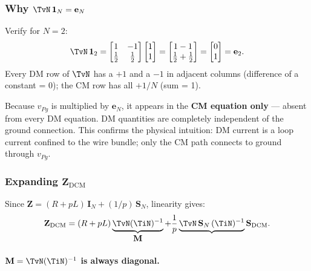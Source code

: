 \subsubsection*{Why $\TvN\,\mathbf{1}_N = \mathbf{e}_N$}

Verify for $N = 2$:
\[
\TvN\,\mathbf{1}_2
=
\begin{bmatrix}
1 & -1 \\ \tfrac{1}{2} & \tfrac{1}{2}
\end{bmatrix}
\begin{bmatrix}1 \\ 1\end{bmatrix}
=
\begin{bmatrix}1-1 \\ \tfrac{1}{2}+\tfrac{1}{2}\end{bmatrix}
=
\begin{bmatrix}0 \\ 1\end{bmatrix}
= \mathbf{e}_2.
\]
Every DM row of $\TvN$ has a $+1$ and a $-1$ in adjacent columns
(difference of a constant = 0); the CM row has all $+1/N$ (sum = 1).

\begin{statebox}
Because $v_{Pg}$ is multiplied by $\mathbf{e}_N$, it appears in the
\textbf{CM equation only} — absent from every DM equation.
DM quantities are completely independent of the ground connection.
This confirms the physical intuition: DM current is a loop current
confined to the wire bundle; only the CM path connects to ground
through $v_{Pg}$.
\end{statebox}

\subsubsection*{Expanding $\mathbf{Z}_{\mathrm{DCM}}$}

Since $\mathbf{Z} = (R + pL)\,\mathbf{I}_N + (1/p)\,\mathbf{S}_N$,
linearity gives:
\[
    \mathbf{Z}_{\mathrm{DCM}}
    = (R + pL)\underbrace{\TvN(\TiN)^{-1}}_{\displaystyle\mathbf{M}}
    + \frac{1}{p}\underbrace{\TvN\,\mathbf{S}_N\,(\TiN)^{-1}}
                             {\displaystyle\mathbf{S}_{\mathrm{DCM}}}.
\]

\paragraph{$\mathbf{M} = \TvN(\TiN)^{-1}$ is always diagonal.}

